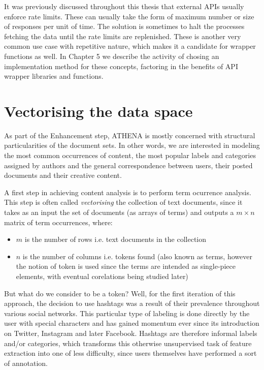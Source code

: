 \documentclass[12pt,a4paper,twoside]{report}
\begin{document}
It was previously discussed throughout this thesis that external APIs usually enforce rate limits. These can usually take the form of maximum number or size of responses per unit of time. The solution is sometimes to halt the processes fetching the data until the rate limits are replenished. These is another very common use case with repetitive nature, which makes it a candidate for wrapper functions as well. In Chapter 5 we describe the activity of chosing an implementation method for these concepts, factoring in the benefits of API wrapper libraries and functions.

\section{Vectorising the data space}
As part of the Enhancement step, ATHENA is mostly concerned with structural particularities of the document sets. In other words, we are interested in modeling the most common occurrences of content, the most popular labels and categories assigned by authors and the general correspondence between users, their posted documents and their creative content.

A first step in achieving content analysis is to perform term ocurrence analysis. This step is often called \emph{vectorising} the collection of text documents, since it takes as an input the set of documents (as arrays of terms) and outputs a $m \times n$ matrix of term occurrences, where:

\begin{itemize}
\item $m$ is the number of rows i.e. text documents in the collection
\item $n$ is the number of columns i.e. tokens found (also known as terms, however the notion of token is used since the terms are intended as single-piece elements, with eventual corelations being studied later)
\end{itemize}

But what do we consider to be a token? Well, for the first iteration of this approach, the decision to use hashtags was a result of their prevalence throughout various social networks. This particular type of labeling is done directly by the user with special characters and has gained momentum ever since its introduction on Twitter, Instagram and later Facebook. Hashtags are therefore informal labels and/or categories, which transforms this otherwise unsupervised task of feature extraction into one of less difficulty, since users themselves have performed a sort of annotation.
\end{document}
